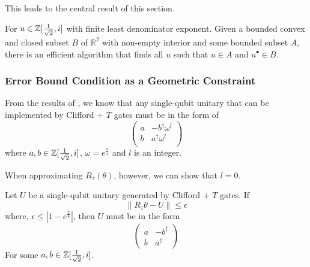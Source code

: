 This leads to the central result of this section.

\begin{corollary}\label{grid-algorithm}
	For $u \in \mathbb{Z}[\frac{1}{\sqrt{2}}, i]$ with finite least denominator exponent.
	Given a bounded convex and closed subset $B$ of $\mathbb{R}^2$ with non-empty interior and some bounded subset $A$, there is an efficient algorithm that finds all $u$ such that $u \in A$ and $u^{\bullet} \in B$.
\end{corollary}

\subsubsection{Error Bound Condition as a Geometric Constraint}

From the results of \cite{exact-clifford+t}, we know that any single-qubit unitary that can be implemented by Clifford + $T$ gates must be in the form of 
\begin{equation}\label{clifford+t-form-1}
\begin{pmatrix}
	a & -b^\dagger \omega^l \\ 
	b & a^\dagger \omega^l \\
\end{pmatrix}
\end{equation}
where $a, b \in \mathbb{Z}[\frac{1}{\sqrt{2}}, i]$, $\omega = e^{\frac{\pi}{4}}$ and $l$ is an integer. 

When approximating $R_z(\theta)$, however, we can show that $l = 0$.

\begin{lemma}
	Let $U$ be a single-qubit unitary generated by Clifford + $T$ gates. If
	\begin{equation}\label{error-bound}
		\|R_z{\theta} - U\| \leq \epsilon
	\end{equation}
	where, $\epsilon \leq |1 - e^{\frac{\pi}{8}}|$, then $U$ must be in the form 
	\begin{equation}\label{clifford+t-form-nophase}
	\begin{pmatrix}
		a & -b^\dagger \\ 
		b & a^\dagger 
	\end{pmatrix}
	\end{equation}
	For some $a, b \in \mathbb{Z}[\frac{1}{\sqrt{2}}, i]$.
\end{lemma}

